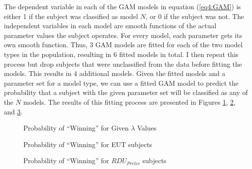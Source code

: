 \documentclass[../main.tex]{subfiles}
\begin{document}
The dependent variable in each of the GAM models in equation (\ref{eq4:GAM}) is either 1 if the subject was classified as model $N$, or 0 if the subject was not.
The independent variables in each model are smooth functions of the actual parameter values the subject operates.
For every model, each parameter gets its own smooth function.
Thus, 3 GAM models are fitted for each of the two model types in the population, resulting in 6 fitted models in total.
I then repeat this process but drop subjects that were unclassified from the data before fitting the models.
This results in 4 additional models.
Given the fitted models and a parameter set for a model type, we can use a fitted GAM model to predict the probability that a subject with the given parameter set will be classified as any of the $N$ models.
The results of this fitting process are presented in Figures \ref{fig:HN1_win_mu}, \ref{fig:HN1_win_eut}, and \ref{fig:HN1_win_pre}.

\begin{figure}[h!]
	\center
	\caption{Probability of \enquote{Winning} for Given $\lambda$ Values}
	\label{fig:HN1_win_mu}
\end{figure}

\begin{figure}[h!]
	\center
	\caption{Probability of \enquote{Winning} for EUT subjects}
	\label{fig:HN1_win_eut}
\end{figure}

\begin{figure}[h!]
	\center
	\caption{Probability of \enquote{Winning} for $\mathit{RDU_{Prelec}}$ subjects}
	\label{fig:HN1_win_pre}
\end{figure}
\end{document}
